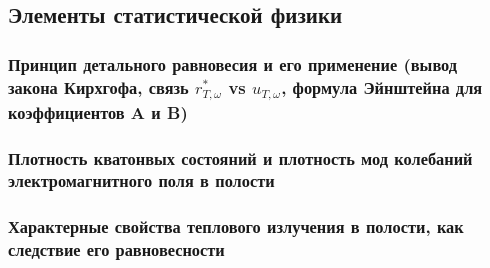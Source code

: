 \subsection{Элементы статистической физики}

\subsubsection{Принцип детального равновесия и его применение (вывод закона Кирхгофа, связь $r_{T, \omega}^*$ vs $u_{T, \omega}$, формула Эйнштейна для коэффициентов A и B)}

\subsubsection{Плотность кватонвых состояний и плотность мод колебаний электромагнитного поля в полости}

\subsubsection{Характерные свойства теплового излучения в полости, как следствие его равновесности}

